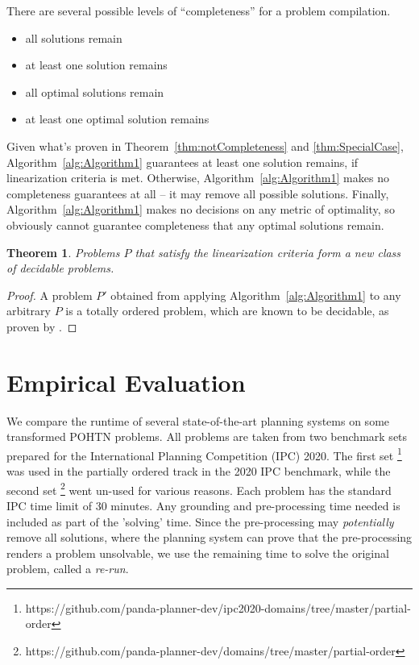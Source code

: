 \documentclass[letterpaper]{article} %
\newtheorem{theorem}{Theorem}
\begin{document}
There are several possible levels of \enquote{completeness} for a problem compilation.
\begin{itemize}
	\item all solutions remain 
	\item at least one solution remains 
	\item all optimal solutions remain
	\item at least one optimal solution remains 	
\end{itemize}
Given what's proven in Theorem~\ref{thm:notCompleteness} and \ref{thm:SpecialCase}, Algorithm~\ref{alg:Algorithm1} guarantees at least one solution remains, if linearization criteria is met. Otherwise, Algorithm~\ref{alg:Algorithm1} makes no completeness guarantees at all -- it may remove all possible solutions. Finally, Algorithm~\ref{alg:Algorithm1} makes no decisions on any metric of optimality, so obviously cannot guarantee completeness that any optimal solutions remain.


\begin{theorem}\label{thm:newClass}
	Problems $P$ that satisfy the linearization criteria form a new class of decidable problems.
\end{theorem}
\begin{proof}
	A problem $P'$ obtained from applying Algorithm~\ref{alg:Algorithm1} to any arbitrary $P$ is a totally ordered problem, which are known to be decidable, as proven by \cite{Alford2015TightHTNBounds}.  
\end{proof}

 



\section{Empirical Evaluation}
We compare the runtime of several state-of-the-art planning systems on some transformed POHTN problems. All problems are taken from two benchmark sets prepared for the International Planning Competition (IPC) 2020. The first set \footnote{https://github.com/panda-planner-dev/ipc2020-domains/tree/master/partial-order} was used in the partially ordered track in the 2020 IPC benchmark, while the second set \footnote{https://github.com/panda-planner-dev/domains/tree/master/partial-order} went un-used for various reasons. Each problem has the standard IPC time limit of 30 minutes. Any grounding and pre-processing time needed is included as part of the 'solving' time. Since the pre-processing may \emph{potentially} remove all solutions, where the planning system can prove that the pre-processing renders a problem unsolvable, we use the remaining time to solve the original problem, called a \textit{re-run}.
\end{document}
